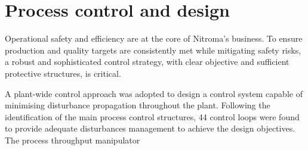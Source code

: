 \section*{Process control and design}

Operational safety and efficiency are at the core of Nitroma's business. To ensure production and quality targets are consistently met while mitigating safety risks, a robust and sophisticated control strategy, with clear objective and sufficient protective structures, is critical.

A plant-wide control approach was adopted to design a control system capable of minimising disturbance propagation throughout the plant. Following the identification of the main process control structures, 44 control loops were found to provide adequate disturbances management to achieve the design objectives. The process throughput manipulator






